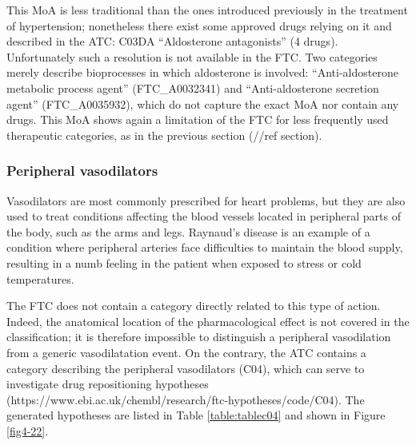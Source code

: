 This MoA is less traditional than the ones introduced previously in the treatment of hypertension; nonetheless there exist some approved drugs relying on it and described in the ATC: C03DA “Aldosterone antagonists” (4 drugs). Unfortunately such a resolution is not available in the FTC. Two categories merely describe bioprocesses in which aldosterone is involved: “Anti-aldosterone metabolic process agent” (FTC\_A0032341) and “Anti-aldosterone secretion agent” (FTC\_A0035932), which do not capture the exact MoA nor contain any drugs. This MoA shows again a limitation of the FTC for less frequently used therapeutic categories, as in the previous section (//ref section).

\subsubsection{Peripheral vasodilators}
Vasodilators are most commonly prescribed for heart problems, but they are also used to treat conditions affecting the blood vessels located in peripheral parts of the body, such as the arms and legs. Raynaud’s disease is an example of a condition where peripheral arteries face difficulties to maintain the blood supply, resulting in a numb feeling in the patient when exposed to stress or cold temperatures.

The FTC does not contain a category directly related to this type of action. Indeed, the anatomical location of the pharmacological effect is not covered in the classification; it is therefore impossible to distinguish a peripheral vasodilation from a generic vasodilatation event. On the contrary, the ATC contains a category describing the peripheral vasodilators (C04), which can serve to investigate drug repositioning hypotheses (https://www.ebi.ac.uk/chembl/research/ftc-hypotheses/code/C04). The generated hypotheses are listed in Table \ref{table:tablec04} and shown in Figure \ref{fig4-22}.

